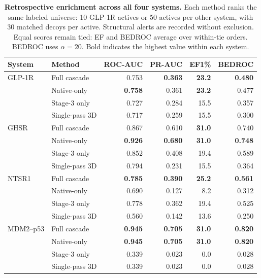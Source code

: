 \begin{table}[tbp]
\centering
\caption{\textbf{Retrospective enrichment across all four systems.} Each method ranks the same labeled universe: 10 GLP-1R actives or 50 actives per other system, with 30 matched decoys per active. Structural alerts are recorded without exclusion. Equal scores remain tied: EF and BEDROC average over within-tie orders. BEDROC uses $\alpha=20$. Bold indicates the highest value within each system.}
\label{tab:crosssystem}
\footnotesize
\setlength{\tabcolsep}{4pt}
\begin{tabular}{@{}llrrrr@{}}
\toprule
System & Method & ROC-AUC & PR-AUC & EF1\% & BEDROC \\
\midrule
GLP-1R & Full cascade & 0.753 & \textbf{0.363} & \textbf{23.2} & \textbf{0.480} \\
 & Native-only & \textbf{0.758} & 0.361 & \textbf{23.2} & 0.477 \\
 & Stage-3 only & 0.727 & 0.284 & 15.5 & 0.357 \\
 & Single-pass 3D & 0.717 & 0.259 & 15.5 & 0.300 \\
GHSR & Full cascade & 0.867 & 0.610 & \textbf{31.0} & 0.740 \\
 & Native-only & \textbf{0.926} & \textbf{0.680} & \textbf{31.0} & \textbf{0.748} \\
 & Stage-3 only & 0.852 & 0.408 & 19.4 & 0.589 \\
 & Single-pass 3D & 0.794 & 0.231 & 15.5 & 0.364 \\
NTSR1 & Full cascade & \textbf{0.785} & \textbf{0.390} & \textbf{25.2} & \textbf{0.561} \\
 & Native-only & 0.690 & 0.127 & 8.2 & 0.312 \\
 & Stage-3 only & 0.778 & 0.362 & 19.4 & 0.525 \\
 & Single-pass 3D & 0.560 & 0.142 & 13.6 & 0.250 \\
MDM2--p53 & Full cascade & \textbf{0.945} & \textbf{0.705} & \textbf{31.0} & \textbf{0.820} \\
 & Native-only & \textbf{0.945} & \textbf{0.705} & \textbf{31.0} & \textbf{0.820} \\
 & Stage-3 only & 0.339 & 0.023 & 0.0 & 0.028 \\
 & Single-pass 3D & 0.339 & 0.023 & 0.0 & 0.028 \\
\bottomrule
\end{tabular}
\end{table}
